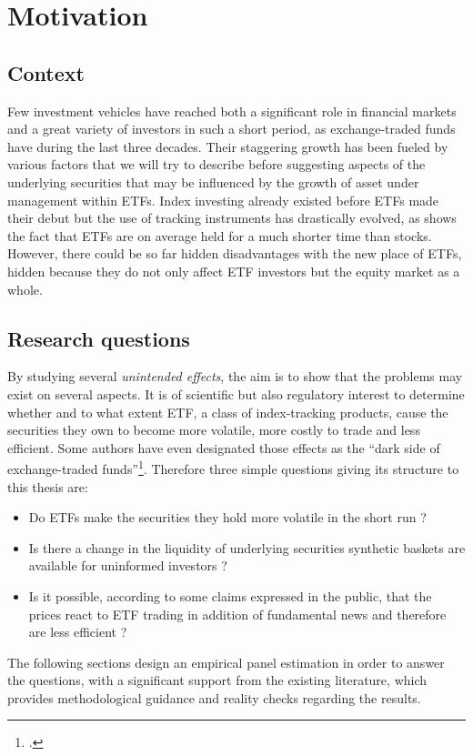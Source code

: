 \section{Motivation}
\label{sec:Motivation}
\subsection{Context}
Few investment vehicles have reached both a significant role in financial markets and a great variety of investors in such a short period, as exchange-traded funds have during the last three decades. Their staggering growth has been fueled by various factors that we will try to describe before suggesting aspects of the underlying securities that may be influenced by the growth of asset under management within ETFs. Index investing already existed before ETFs made their debut but the use of tracking instruments has drastically evolved, as shows the fact that ETFs are on average held for a much shorter time than stocks. However, there could be so far hidden disadvantages with the new place of ETFs, hidden because they do not only affect ETF investors but the equity market as a whole.

\subsection{Research questions}
By studying several \emph{unintended effects}, the aim is to show that the problems may exist on several aspects. It is of scientific but also regulatory interest to determine whether and to what extent ETF, a class of index-tracking products, cause the securities they own to become more volatile, more costly to trade and less efficient. Some authors have even designated those effects as the ``dark side of exchange-traded funds''\footcite{Israeli2017}. Therefore three simple questions giving its structure to this thesis are:
\begin{itemize}
\item Do ETFs make the securities they hold more volatile in the short run ?
\item Is there a change in the liquidity of underlying securities synthetic baskets are available for uninformed investors ?
  \item Is it possible, according to some claims expressed in the public, that the prices react to ETF trading in addition of fundamental news and therefore are less efficient ?
\end{itemize}
The following sections design an empirical panel estimation in order to answer the questions, with a significant support from the existing literature, which provides methodological guidance and reality checks regarding the results.

